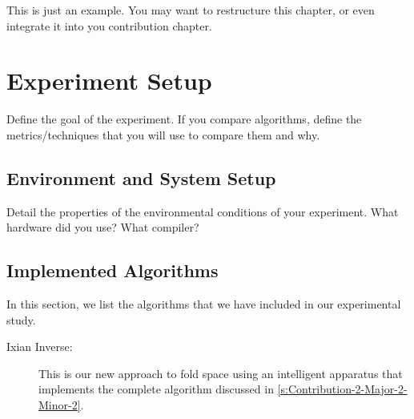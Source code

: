 
This is just an example. You may want to restructure this chapter, or even integrate it into you contribution chapter. 

\section{Experiment Setup}
\label{s:Experiment-Setup}

Define the goal of the experiment. If you compare algorithms, define the metrics/techniques that you will use to compare them and why.


\subsection{Environment and System Setup}
\label{s:Experiment-Env}

Detail the properties of the environmental conditions of your experiment. What hardware did you use? What compiler?


\subsection{Implemented Algorithms}
\label{s:Experiment-Algo}


In this section, we list the algorithms that we have included in our experimental study.

\begin{description}
  

  \item[Ixian Inverse:] This is our new approach to fold space using an intelligent apparatus that implements the complete algorithm discussed in \autoref{s:Contribution-2-Major-2-Minor-2}.

\end{description}


